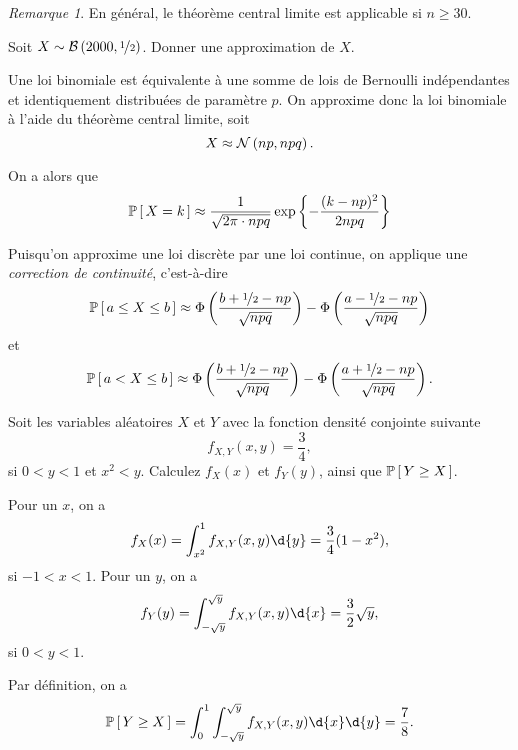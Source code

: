 \documentclass[11pt]{article}
\renewcommand\P[1]{%
	\ensuremath{%
		\mathbb{P}\left[\,#1\,\right]%
	}%
}%
\newcommand\Bin[2]{%
	\ensuremath{%
		\mathcal{B}\left(#1,#2\right)%
	}%
}%
\newcommand\Norm[2]{%
	\ensuremath{%
		\mathcal{N}\left(#1,#2\right)%
	}%
}%
\theoremstyle{remark}
\newtheorem*{remark}{Remarque}
\theoremstyle{definition}
\begin{document}
\begin{remark}
	En général, le théorème central limite est applicable si $n\geq 30$.
\end{remark}

\begin{exemple}
	Soit $X\sim\Bin{2000}{\nicefrac{1}{2}}$. Donner une approximation de $X$.

	Une loi binomiale est équivalente à une somme de lois de Bernoulli
	indépendantes et identiquement distribuées de paramètre $p$. On approxime
	donc la loi binomiale à l'aide du théorème central limite, soit
	\begin{equation*}
		X\approx\Norm{np}{npq}.
	\end{equation*}
	
	On a alors que
	\begin{equation*}
		\P{X=k}\approx\frac{1}{\sqrt{2\pi\cdot npq}}\exp\left\{
			-\frac{(k-np)^2}{2npq}
		\right\}
	\end{equation*}

	Puisqu'on approxime une loi discrète par une loi continue, on applique
	une \textit{correction de continuité}, c'est-à-dire
	\begin{equation*}
		\P{a\leq X\leq b}
		\approx\Phi\left(
			\frac{b+\nicefrac{1}{2}-np}{\sqrt{npq}}
		\right)-\Phi\left(
			\frac{a-\nicefrac{1}{2}-np}{\sqrt{npq}}
		\right)
	\end{equation*}
	et
	\begin{equation*}
		\P{a<X\leq b}
		\approx\Phi\left(
			\frac{b+\nicefrac{1}{2}-np}{\sqrt{npq}}
		\right)-\Phi\left(
			\frac{a+\nicefrac{1}{2}-np}{\sqrt{npq}}
		\right).
	\end{equation*}
\end{exemple}

\pagebreak
\begin{exemple}
	Soit les variables aléatoires $X$ et $Y$ avec la fonction densité conjointe
	suivante
	\begin{equation*}
		f_{X,Y}(x,y)=\frac{3}{4},
	\end{equation*}
	si $0<y<1$ et $x^2<y$. Calculez $f_X(x)$ et $f_Y(y)$, ainsi que
	$\P{Y\geq X}$.

	Pour un $x$, on a
	\begin{equation*}
		f_X(x)
		=\int_{x^2}^1f_{X,Y}(x,y)\d{y}
		=\frac{3}{4}(1-x^2),
	\end{equation*}
	si $-1<x<1$. Pour un $y$, on a
	\begin{equation*}
		f_Y(y)
		=\int_{-\sqrt{y}}^{\sqrt{y}}f_{X,Y}(x,y)\d{x}
		=\frac{3}{2}\sqrt{y},
	\end{equation*}
	si $0<y<1$.

	Par définition, on a
	\begin{equation*}
		\P{Y\geq X}
		=\int_0^1\int_{-\sqrt{y}}^{\sqrt{y}}f_{X,Y}(x,y)\d{x}\d{y}
		=\frac{7}{8}.
	\end{equation*}
\end{exemple}
\end{document}
